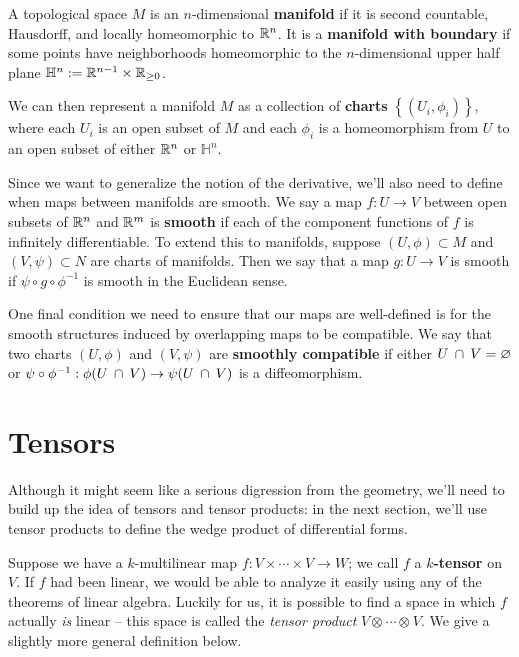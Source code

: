 \documentclass[twoside,10pt]{article}
\begin{document}
\begin{defn}[]
	A topological space $M$ is an $n$-dimensional \textbf{manifold} if it is second countable, Hausdorff, and locally homeomorphic to $\mathbb{R}^{n}$. It is a \textbf{manifold with boundary} if some points have neighborhoods homeomorphic to the $n$-dimensional upper half plane $\mathbb{H}^{n} := \mathbb{R}^{n-1} \times \mathbb{R}_{\geq 0}$.
\end{defn}

We can then represent a manifold $M$ as a collection of \textbf{charts} $\left\{ (U_i, \phi_i) \right\}$, where each $U_i$ is an open subset of $M$ and each $\phi_i$ is a homeomorphism from $U$ to an open subset of either $\mathbb{R}^{n}$ or $\mathbb{H}^{n}$.

Since we want to generalize the notion of the derivative, we'll also need to define when maps between manifolds are smooth. We say a map $f:U\to V$ between open subsets of $\mathbb{R}^{n}$ and $\mathbb{R}^{m}$ is \textbf{smooth} if each of the component functions of $f$ is infinitely differentiable. To extend this to manifolds, suppose $(U,\phi)\subset M$ and $(V,\psi) \subset N$ are charts of manifolds. Then we say that a map $g:U\to V$ is smooth if $\psi \circ g \circ \phi^{-1}$ is smooth in the Euclidean sense.

One final condition we need to ensure that our maps are well-defined is for the smooth structures induced by overlapping maps to be compatible. We say that two charts $(U,\phi)$ and $(V,\psi)$ are \textbf{smoothly compatible} if either $U \operatorname{\;\cap\;} V = \varnothing$ or $\psi \circ \phi^{-1}: \phi(U\operatorname{\;\cap\;} V) \to \psi(U \operatorname{\;\cap\;} V)$ is a diffeomorphism.

\section{Tensors}

Although it might seem like a serious digression from the geometry, we'll need to build up the idea of tensors and tensor products: in the next section, we'll use tensor products to define the wedge product of differential forms.

Suppose we have a $k$-multilinear map $f:V \times \cdots \times V\to W$; we call $f$ a \textbf{$k$-tensor} on $V$. If $f$ had been linear, we would be able to analyze it easily using any of the theorems of linear algebra. Luckily for us, it is possible to find a space in which $f$ actually \textit{is} linear -- this space is called the \textit{tensor product} $V \otimes_{} \cdots \otimes_{}V$. We give a slightly more general definition below.
\end{document}
